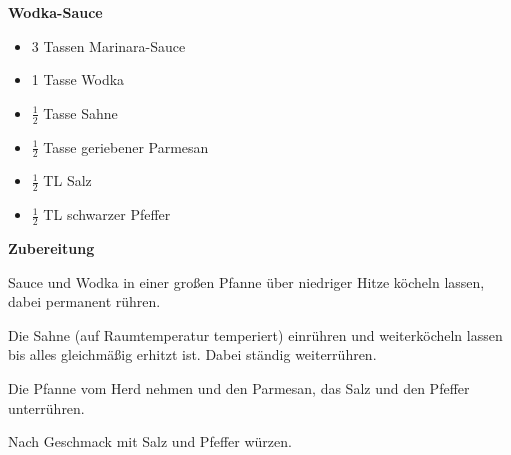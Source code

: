 

\parindent0pt	

\pagestyle{empty}


\textbf{{\LARGE Wodka-Sauce}}%

\hrulefill
\vspace*{\fill}
\begin{multicols}{2}	


\begin{itemize}
\item 3 Tassen Marinara-Sauce
\item 1 Tasse Wodka
\item $\frac{1}{2}$ Tasse Sahne
\item $\frac{1}{2}$ Tasse geriebener Parmesan
\item $\frac{1}{2}$ TL Salz
\item $\frac{1}{2}$ TL schwarzer Pfeffer
\end{itemize}
\end{multicols}
\vfill									%



\vfill
\newpage
\textbf{{\LARGE Zubereitung}}%

\hrulefill

\vspace*{\fill}
\begin{multicols}{2}

Sauce und Wodka in einer großen Pfanne über niedriger Hitze 
köcheln lassen, dabei permanent rühren.\newline

Die Sahne (auf Raumtemperatur temperiert) einrühren und weiterköcheln lassen bis alles gleichmäßig
erhitzt ist. Dabei ständig weiterrühren.\newline

Die Pfanne vom Herd nehmen und den Parmesan, das Salz und den
Pfeffer unterrühren.\newline

Nach Geschmack mit Salz und Pfeffer würzen.  

\end{multicols}
\vfill
